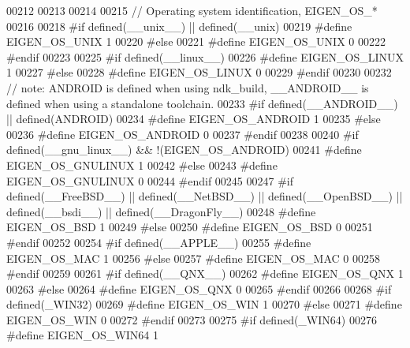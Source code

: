 \begin{DoxyCode}
00212 
00213 
00214 
00215 \textcolor{comment}{// Operating system identification, EIGEN\_OS\_*}
00216 
00218 \textcolor{preprocessor}{#if defined(\_\_unix\_\_) || defined(\_\_unix)}
00219 \textcolor{preprocessor}{  #define EIGEN\_OS\_UNIX 1}
00220 \textcolor{preprocessor}{#else}
00221 \textcolor{preprocessor}{  #define EIGEN\_OS\_UNIX 0}
00222 \textcolor{preprocessor}{#endif}
00223 
00225 \textcolor{preprocessor}{#if defined(\_\_linux\_\_)}
00226 \textcolor{preprocessor}{  #define EIGEN\_OS\_LINUX 1}
00227 \textcolor{preprocessor}{#else}
00228 \textcolor{preprocessor}{  #define EIGEN\_OS\_LINUX 0}
00229 \textcolor{preprocessor}{#endif}
00230 
00232 \textcolor{comment}{// note: ANDROID is defined when using ndk\_build, \_\_ANDROID\_\_ is defined when using a standalone toolchain.}
00233 \textcolor{preprocessor}{#if defined(\_\_ANDROID\_\_) || defined(ANDROID)}
00234 \textcolor{preprocessor}{  #define EIGEN\_OS\_ANDROID 1}
00235 \textcolor{preprocessor}{#else}
00236 \textcolor{preprocessor}{  #define EIGEN\_OS\_ANDROID 0}
00237 \textcolor{preprocessor}{#endif}
00238 
00240 \textcolor{preprocessor}{#if defined(\_\_gnu\_linux\_\_) && !(EIGEN\_OS\_ANDROID)}
00241 \textcolor{preprocessor}{  #define EIGEN\_OS\_GNULINUX 1}
00242 \textcolor{preprocessor}{#else}
00243 \textcolor{preprocessor}{  #define EIGEN\_OS\_GNULINUX 0}
00244 \textcolor{preprocessor}{#endif}
00245 
00247 \textcolor{preprocessor}{#if defined(\_\_FreeBSD\_\_) || defined(\_\_NetBSD\_\_) || defined(\_\_OpenBSD\_\_) || defined(\_\_bsdi\_\_) ||
       defined(\_\_DragonFly\_\_)}
00248 \textcolor{preprocessor}{  #define EIGEN\_OS\_BSD 1}
00249 \textcolor{preprocessor}{#else}
00250 \textcolor{preprocessor}{  #define EIGEN\_OS\_BSD 0}
00251 \textcolor{preprocessor}{#endif}
00252 
00254 \textcolor{preprocessor}{#if defined(\_\_APPLE\_\_)}
00255 \textcolor{preprocessor}{  #define EIGEN\_OS\_MAC 1}
00256 \textcolor{preprocessor}{#else}
00257 \textcolor{preprocessor}{  #define EIGEN\_OS\_MAC 0}
00258 \textcolor{preprocessor}{#endif}
00259 
00261 \textcolor{preprocessor}{#if defined(\_\_QNX\_\_)}
00262 \textcolor{preprocessor}{  #define EIGEN\_OS\_QNX 1}
00263 \textcolor{preprocessor}{#else}
00264 \textcolor{preprocessor}{  #define EIGEN\_OS\_QNX 0}
00265 \textcolor{preprocessor}{#endif}
00266 
00268 \textcolor{preprocessor}{#if defined(\_WIN32)}
00269 \textcolor{preprocessor}{  #define EIGEN\_OS\_WIN 1}
00270 \textcolor{preprocessor}{#else}
00271 \textcolor{preprocessor}{  #define EIGEN\_OS\_WIN 0}
00272 \textcolor{preprocessor}{#endif}
00273 
00275 \textcolor{preprocessor}{#if defined(\_WIN64)}
00276 \textcolor{preprocessor}{  #define EIGEN\_OS\_WIN64 1}

\end{DoxyCode}
